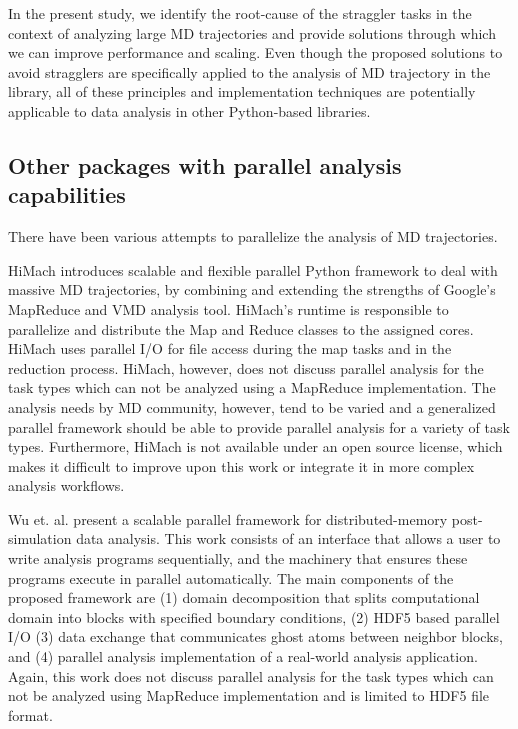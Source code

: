 In the present study, we identify the root-cause of the straggler tasks in the context of analyzing large MD trajectories and provide solutions through which we can improve performance and scaling.
Even though the proposed solutions to avoid stragglers are specifically applied to the analysis of MD trajectory in the  library, all of these principles and implementation techniques are potentially applicable to data analysis in other Python-based libraries.


\subsection{Other packages with parallel analysis capabilities}
\label{sec:otherparallel}

There have been various attempts to parallelize the analysis of MD trajectories. 

HiMach \cite{himach-2008} introduces scalable and flexible parallel Python framework to deal with massive MD trajectories, by combining and extending the strengths of Google's MapReduce and VMD analysis tool. 
HiMach's runtime is responsible to parallelize and distribute the Map and Reduce classes to the assigned cores.
HiMach uses parallel I/O for file access during the map tasks and  in the reduction process. 
HiMach, however, does not discuss parallel analysis for the task types which can not be analyzed using a MapReduce implementation.
The analysis needs by MD community, however, tend to be varied and a generalized parallel framework should be able to provide parallel analysis for a variety of task types.
Furthermore, HiMach is not available under an open source license, which makes it difficult to improve upon this work or integrate it in more complex analysis workflows.

Wu et. al. \cite{Wu_et.al} present a scalable parallel framework for distributed-memory post-simulation data analysis.
This work consists of an interface that allows a user to write analysis programs sequentially, and the machinery that ensures these programs execute in parallel automatically. 
The main components of the proposed framework are (1) domain decomposition that splits computational domain into blocks with specified boundary conditions, (2) HDF5 based parallel I/O (3) data exchange that communicates ghost atoms between neighbor blocks, and (4) parallel analysis implementation of a real-world analysis application.
Again, this work does not discuss parallel analysis for the task types which can not be analyzed using MapReduce implementation and is limited to HDF5 file format.

